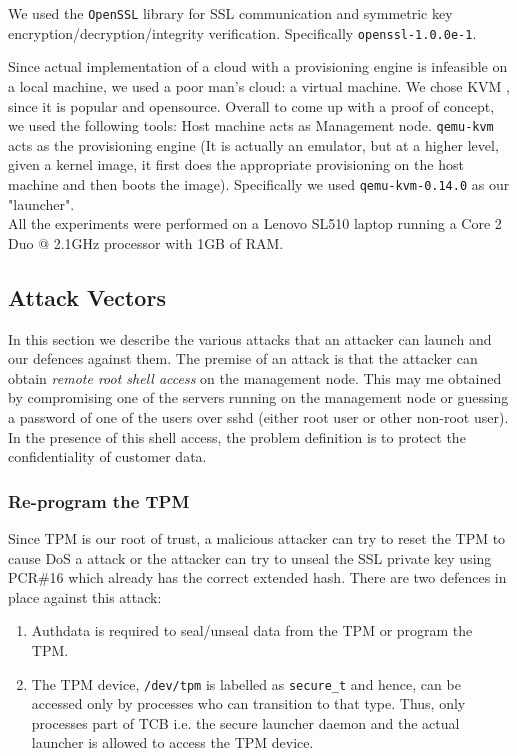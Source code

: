 \documentclass[10pt,twocolumn,pdftex]{article}
\begin{document}
We used the {\tt OpenSSL} library for SSL communication and symmetric key encryption/decryption/integrity verification. Specifically {\tt openssl-1.0.0e-1}. 

Since actual implementation of a cloud with a provisioning engine is infeasible on a local machine, we used a poor man's cloud: a virtual machine. We chose KVM \cite{KVM}, since it is popular and opensource. Overall to come up with a proof of concept, we used the following tools: Host machine acts as Management node. {\tt qemu-kvm} acts as the provisioning engine (It is actually an emulator, but at a higher level, given a kernel image, it first does the appropriate provisioning on the host machine and then boots the image). Specifically we used {\tt qemu-kvm-0.14.0} as our "launcher". \\

All the experiments were performed on a Lenovo SL510 laptop running a Core 2 Duo @ 2.1GHz processor with 1GB of RAM. 

\subsection{Attack Vectors}
In this section we describe the various attacks that an attacker can launch and our defences against them. The premise of an attack is that the attacker can obtain \emph{remote root shell access} on the management node. This may me obtained by compromising one of the servers running on the management node or guessing a password of one of the users over sshd (either root user or other non-root user). In the presence of this shell access, the problem definition is to protect the confidentiality of customer data.

\subsubsection{Re-program the TPM}
Since TPM is our root of trust, a malicious attacker can try to reset the TPM to cause DoS a attack or the attacker can try to unseal the SSL private key using PCR\#16 which already has the correct extended hash. There are two defences in place against this attack:
\begin{enumerate}
\item Authdata is required to seal/unseal data from the TPM or program the TPM.
\item The TPM device, {\tt /dev/tpm} is labelled as {\tt secure\_t} and hence, can be accessed only by processes who can transition to that type. Thus, only processes part of TCB i.e. the secure launcher daemon and the actual launcher is allowed to access the TPM device.
\end{enumerate}
\end{document}
